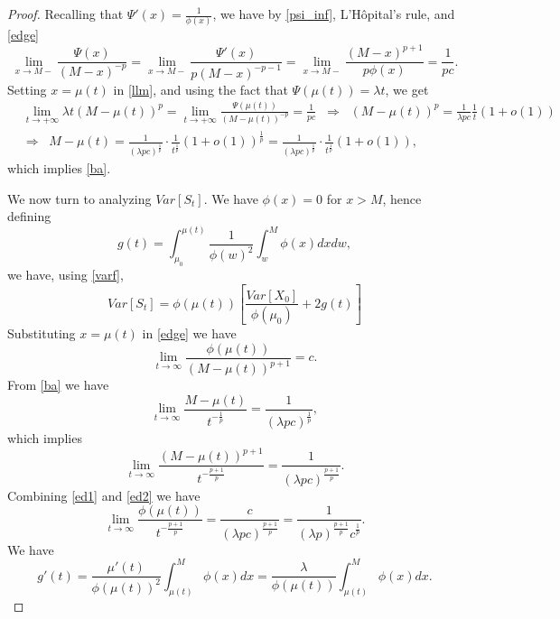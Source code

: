 \documentclass{article}
\numberwithin{equation}{section}
\begin{document}
\begin{proof}

Recalling that $\Psi'(x)=\frac{1}{\phi(x)}$, we have
by \eqref{psi_inf}, L'H\^opital's rule, and \eqref{edge}
\begin{equation}\label{llm}
\lim_{x\rightarrow M-}\frac{\Psi(x)}{(M-x)^{-p}}=\lim_{x\rightarrow M-}\frac{\Psi'(x)}{p(M-x)^{-p-1}}
=\lim_{x\rightarrow M-}\frac{(M-x)^{p+1}}{p\phi(x)}=\frac{1}{pc}.
\end{equation}
Setting $x=\mu(t)$ in \eqref{llm}, and using the fact that 
$\Psi(\mu(t))=\lambda t$, we get
\begin{align*}&\lim_{t\rightarrow +\infty}\lambda t (M-\mu(t))^{p} =\lim_{t\rightarrow +\infty}\frac{\Psi(\mu(t))}{(M-\mu(t))^{-p}}=\frac{1}{pc}\;\;\Rightarrow\;\;(M-\mu(t))^{p} =\frac{1}{\lambda pc}\frac{1}{t}(1+o(1))\\
&\Rightarrow\;\;M-\mu(t) =\frac{1}{(\lambda pc)^{\frac{1}{p}}}\cdot\frac{1}{t^{\frac{1}{p}}}\left(1+o\left(1 \right)\right)^{\frac{1}{p}}=\frac{1}{(\lambda pc)^{\frac{1}{p}}}\cdot\frac{1}{t^{\frac{1}{p}}}\left(1+o\left(1 \right) \right),
\end{align*}
which implies \eqref{ba}.

We now turn to analyzing $Var[S_t]$.
We have $\phi(x)=0$ for 
$x>M$, hence
defining 
$$g(t)=\int_{\mu_0}^{\mu(t)}\frac{1}{\phi(w)^2} \int_{w}^M \phi(x) dx dw,$$
we have, using \eqref{varf},
\begin{equation}\label{varb}Var[S_t]=\phi(\mu(t)) \left[\frac{Var[X_0]}{\phi(\mu_0)} +2g(t)
\right]\end{equation}
Substituting $x=\mu(t)$ in \eqref{edge}
we have
\begin{equation}\label{ed1}
\lim_{t\rightarrow \infty}\frac{\phi(\mu(t))}{(M-\mu(t))^{p+1}}=c.
\end{equation}
From \eqref{ba} we have
\begin{equation}\label{ed0}\lim_{t\rightarrow \infty}\frac{M-\mu(t)}{t^{-\frac{1}{p}}}=\frac{1}{(\lambda pc)^{\frac{1}{p} }},\end{equation}
which implies
\begin{equation}\label{ed2}\lim_{t\rightarrow \infty}\frac{(M-\mu(t))^{p+1}}{t^{-\frac{p+1}{p}}}=\frac{1}{(\lambda pc)^{\frac{p+1}{p} }}.\end{equation}
Combining \eqref{ed1} and \eqref{ed2} we have
\begin{equation}\label{ed3}
\lim_{t\rightarrow \infty}\frac{\phi(\mu(t))}{t^{-\frac{p+1}{p}}}=\frac{c}{(\lambda pc)^{\frac{p+1}{p} }}=\frac{1}{(\lambda p)^{\frac{p+1}{p} }c^{\frac{1}{p}}}.
\end{equation}
We have
\begin{equation}\label{rr}g'(t)=\frac{\mu'(t)}{\phi(\mu(t))^2}\int_{\mu(t)}^M\phi(x)dx=\frac{\lambda}{\phi(\mu(t))}\int_{\mu(t)}^M\phi(x)dx.\end{equation}


\end{proof}
\end{document}
